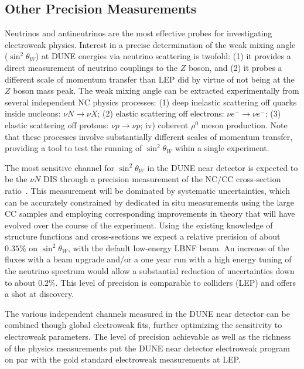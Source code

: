 {\subsection{Other Precision Measurements}

Neutrinos and antineutrinos are the most effective probes for investigating electroweak physics.  
Interest in a precise determination of the weak mixing angle ($\sin^2 \theta_W$) at DUNE 
energies via neutrino scattering is twofold: (1) it provides a direct measurement of neutrino couplings to 
the $Z$ boson, and (2) it probes a different scale of momentum transfer than LEP did by virtue
of not being at the $Z$ boson mass peak. 
% 
The weak mixing angle can be extracted experimentally from several independent NC physics processes:
(1) deep inelastic scattering off quarks inside nucleons: $\nu N \to \nu X$; (2) elastic scattering off electrons: $\nu e^- \to \nu e^-$; 
(3) elastic scattering off protons: $\nu p \to \nu p$; iv) coherent $\rho^0$ meson production. 
Note that these processes involve
substantially different scales of momentum transfer, providing a tool
to test the running of $\sin^2 \theta_W$ wihin a single experiment. 

The most sensitive channel for $\sin^2 \theta_W$ 
in the DUNE near detector is expected to be the $\nu N$ DIS through a precision measurement 
of the NC/CC cross-section ratio~\cite{near-detector-EW}. This measurement will be dominated by systematic uncertainties, which can be 
accurately constrained by dedicated in situ measurements using the large CC samples and employing corresponding 
improvements in theory that will have evolved over the course of the experiment. Using the existing knowledge of 
structure functions and cross-sections we expect a relative precision of about $0.35\%$ on $\sin^2 \theta_W$, with 
the default low-energy LBNF beam. An increase of the fluxes with a beam upgrade and/or a one year run with a high 
energy tuning of the neutrino spectrum would allow a substantial reduction of uncertainties down to about $0.2\%$. 
This level of precision is comparable to colliders (LEP) and offers a shot at discovery.
 
The various independent channels measured in the DUNE near detector can be combined though global electroweak fits, 
further optimizing the sensitivity to electroweak parameters. The level of precision achievable as well as the richness of 
the physics measurements put the DUNE near detector electroweak program on par with the gold standard electroweak measurements at LEP.   



}
